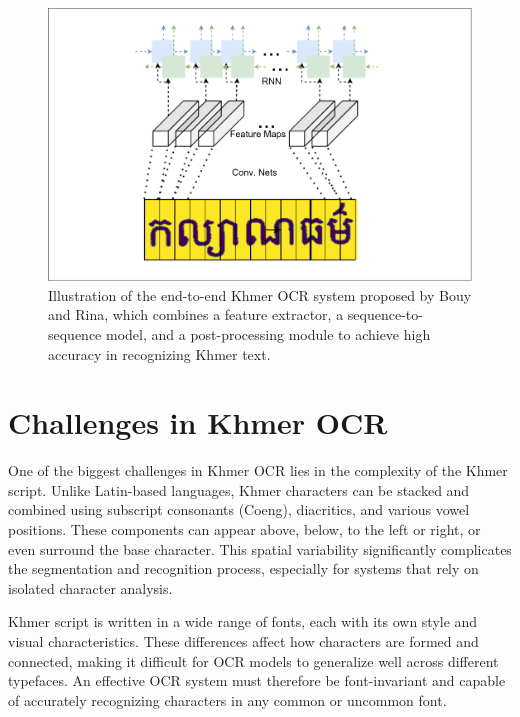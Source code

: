 \begin{figure}[ht]
    \centering
    \includegraphics[width=\textwidth]{figures/bouy_rina_end_to_end_khmer_ocr.png}
    \caption{Illustration of the end-to-end Khmer OCR system proposed by Bouy and Rina,
    which combines a feature extractor, a sequence-to-sequence model,
     and a post-processing module to achieve high accuracy in recognizing Khmer text. \citep{buoy2021seq2seq}}
    \label{fig:bouy-rina-end-to-end-khmer-ocr}
\end{figure}


\section{Challenges in Khmer OCR}
\label{sec:datasets}

One of the biggest challenges in Khmer OCR lies in the complexity of the Khmer script. 
Unlike Latin-based languages,  Khmer characters can be stacked and combined using 
subscript consonants (Coeng), \citep{buoy2021seq2seq} diacritics, and various vowel positions. These components 
can appear above, below, to the left or right, or even surround the base character. 
This spatial variability significantly complicates the segmentation and recognition 
process, especially for systems that rely on isolated character analysis.

Khmer script is written in a wide range of fonts, each with its own style and visual 
characteristics. \citep{buoy2021seq2seq} These differences affect how characters are formed and connected, 
making it difficult for OCR models to generalize well across different typefaces. 
An effective OCR system must therefore be font-invariant and capable of accurately 
recognizing characters in any common or uncommon font.

